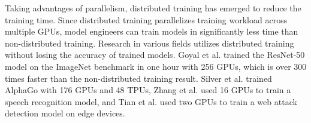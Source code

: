 Taking advantages of parallelism, distributed training has emerged to reduce
the training time. 
Since distributed training parallelizes training workload across multiple GPUs,
model engineers can train models in significantly less time than
non-distributed training.
Research in various fields utilizes distributed training without losing
the accuracy of trained models.
Goyal et al.\cite{facebook2018} trained the ResNet-50 model on the ImageNet
benchmark in one hour with 256 GPUs, which is over 300 times faster than the
non-distributed training result.
Silver et al.\cite{Silver2017alphagozero} trained AlphaGo with 176
GPUs and 48 TPUs, Zhang et al.\cite{zhang2019distrspeech} used 16 GPUs to train
a speech recognition model, and Tian et al.\cite{tian2020distrwebattack} used
two GPUs to train a web attack detection model on edge devices.




